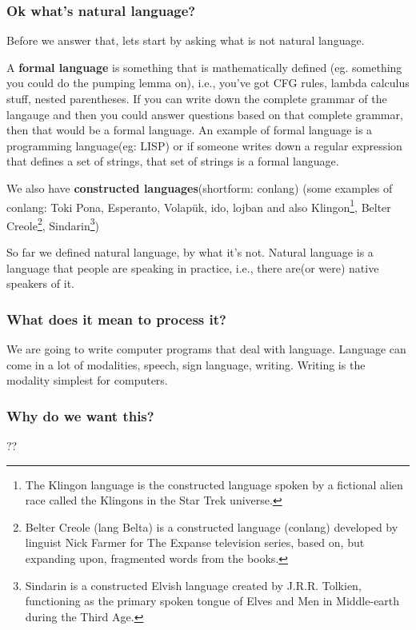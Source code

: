 \documentclass[11pt]{article}
\begin{document}
\subsubsection{Ok what's natural language?}
Before we answer that, lets start by asking what is not natural language.

A \textbf{formal language} is something that is mathematically defined (eg. something you could do the pumping lemma on), i.e., you've got CFG rules, lambda calculus stuff, nested parentheses. If you can write down the complete grammar of the langauge and then you could answer questions based on that complete grammar, then that would be a formal language. An example of formal language is a programming language(eg: LISP) or if someone writes down a regular expression that defines a set of strings, that set of strings is a formal language. 



We also have \textbf{constructed languages}(shortform: conlang) (some examples of conlang: Toki Pona, Esperanto, Volapük, ido, lojban and also Klingon\footnote{The Klingon language is the constructed language spoken by a fictional alien race called the Klingons in the Star Trek universe.}, Belter Creole\footnote{Belter Creole (lang Belta) is a constructed language (conlang) developed by linguist Nick Farmer for The Expanse television series, based on, but expanding upon, fragmented words from the books.}, Sindarin\footnote{Sindarin is a constructed Elvish language created by J.R.R. Tolkien, functioning as the primary spoken tongue of Elves and Men in Middle-earth during the Third Age.})

So far we defined natural language, by what it's not. Natural language is a language that people are speaking in practice, i.e., there are(or were) native speakers of it.

\subsubsection{What does it mean to process it?}
We are going to write computer programs that deal with language. Language can come in a lot of modalities, speech, sign language, writing. Writing is the modality simplest for computers. 


\subsubsection{Why do we want this?}

??
\end{document}
